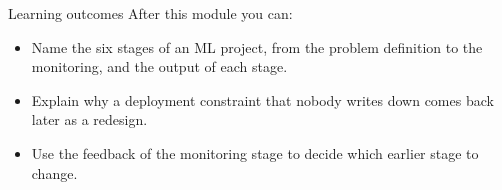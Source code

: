 \begin{frame}{Learning outcomes}
  After this module you can:
  \begin{itemize}
    \item Name the six stages of an ML project, from the problem definition
          to the monitoring, and the output of each stage.
    \item Explain why a deployment constraint that nobody writes down comes
          back later as a redesign.
    \item Use the feedback of the monitoring stage to decide which earlier
          stage to change.
  \end{itemize}
\end{frame}
